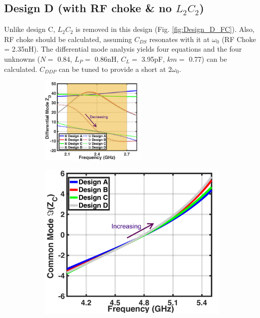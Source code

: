 \documentclass[conference]{IEEEtran}
\begin{document}
\subsection{Design D (with RF choke \& no $L_2C_2$)}
 Unlike design C, $L_2C_2$ is removed in this design (Fig. \ref{fig:Design_D_FC}). Also, RF choke should be calculated, assuming $C_{DS}$ resonates with it at $\omega_0$ (RF Choke = 2.35nH).
The differential mode analysis yields four equations and the four unknowns ($N =$ 0.84, $L_P =$ 0.86nH, $C_L =$ 3.95pF, $km =$ 0.77) can be calculated.
$C_{DDP}$ can be tuned to provide a short at $2\omega_0$.

\begin{figure}[!t]
	\captionsetup{font=footnotesize}
	\centering
	\begin{subfigure}{0.5\textwidth}
		\centering
		\includegraphics[width=0.55\textwidth]{Images/Output_Network_Comp/Comp_1H.pdf}
		\caption{}
		\label{fig:Comp_1H}
	\end{subfigure}
	\begin{subfigure}{0.24\textwidth}
		\includegraphics[width=1\textwidth]{Images/Output_Network_Comp/Comp_2H_imag.pdf}

\end{subfigure}
\end{figure}
\end{document}

